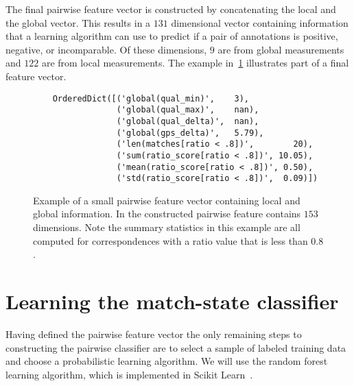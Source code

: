The final pairwise feature vector is constructed by concatenating the local and the global vector.
This results in a $131$ dimensional vector containing information that a learning algorithm can use to predict if
  a pair of annotations is positive, negative, or incomparable.
Of these dimensions, $9$ are from global measurements and $122$ are from local measurements.
The example in~\cref{fig:PairFeatVec} illustrates part of a final feature vector.

\begin{figure}
\begin{verbatim}
    OrderedDict([('global(qual_min)',    3),
                 ('global(qual_max)',    nan),
                 ('global(qual_delta)',  nan),
                 ('global(gps_delta)',   5.79),
                 ('len(matches[ratio < .8])',        20),
                 ('sum(ratio_score[ratio < .8])', 10.05),
                 ('mean(ratio_score[ratio < .8])', 0.50),
                 ('std(ratio_score[ratio < .8])',  0.09)])
\end{verbatim}
\caption[A pairwise feature vector]{ %
Example of a small pairwise feature vector containing local and global information.
In the constructed pairwise feature contains $153$ dimensions.
Note the summary statistics in this example are all computed for correspondences with a ratio value that is less
  than $0.8$.
}
\label{fig:PairFeatVec}
\end{figure}



\section{Learning the match-state classifier}\label{sec:learnclf}

    Having defined the pairwise feature vector the only remaining steps to constructing the pairwise classifier
      are to select a sample of labeled training data and choose a probabilistic learning algorithm.
    We will use the random forest learning algorithm, which is implemented in Scikit
      Learn~\cite{pedregosa_scikit_learn_2011}.

